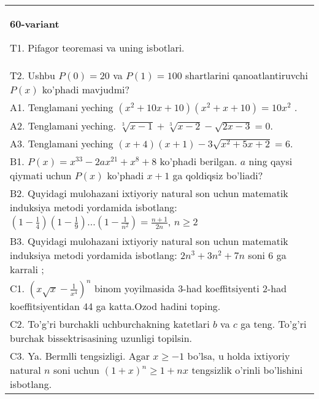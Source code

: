 \documentclass{article}
\begin{document}
\begin{tabular}{m{17cm}}
\textbf{60-variant}
\newline

T1. Pifagor teoremasi va uning isbotlari. \\
T2. Ushbu \(P(0) = 20\) va \(P(1) = 100\) shartlarini qanoatlantiruvchi \(P(x)\) ko'phadi mavjudmi? \\
A1. Tenglamani yeching \(\left( x^{2} + 10x + 10 \right)\left( x^{2} + x + 10 \right) = 10x^{2}\) . \\
A2. Tenglamani yeching. \(\sqrt[3]{x - 1} + \sqrt[3]{x - 2} - \sqrt{2x - 3} = 0\). \\
A3. Tenglamani yeching \((x + 4)(x + 1) - 3\sqrt{x^{2} + 5x + 2} = 6\). \\
B1. \(P(x) = x^{33} - 2ax^{21} + x^{8} + 8\) ko'phadi berilgan. \(a\) ning qaysi qiymati uchun \(P(x)\) ko'phadi \(x + 1\) ga qoldiqsiz bo'liadi? \\
B2. Quyidagi mulohazani ixtiyoriy natural son uchun matematik induksiya metodi yordamida isbotlang: \(\left( 1 - \frac{1}{4} \right)\left( 1 - \frac{1}{9} \right)...\left( 1 - \frac{1}{n^{2}} \right) = \frac{n + 1}{2n}\), \(n \geq 2\) \\
B3. Quyidagi mulohazani ixtiyoriy natural son uchun matematik induksiya metodi yordamida isbotlang: \(2n^{3} + 3n^{2} + 7n\) soni 6 ga karrali ; \\
C1. \(\left( x\sqrt{x} - \frac{1}{x^{4}} \right)^{n}\) binom yoyilmasida 3-had koeffitsiyenti 2-had koeffitsiyentidan 44 ga katta.Ozod hadini toping. \\
C2. To'g'ri burchakli uchburchakning katetlari \(b\) va \(c\) ga teng. To'g'ri burchak bissektrisasining uzunligi topilsin. \\
C3. Ya. Bermlli tengsizligi. Agar \(x \geq - 1\) bo'lsa, u holda ixtiyoriy natural \(n\) soni uchun \((1 + x)^{n} \geq 1 + nx\) tengsizlik o'rinli bo'lishini isbotlang. \\

\end{tabular}
\vspace{1cm}
\end{document}

